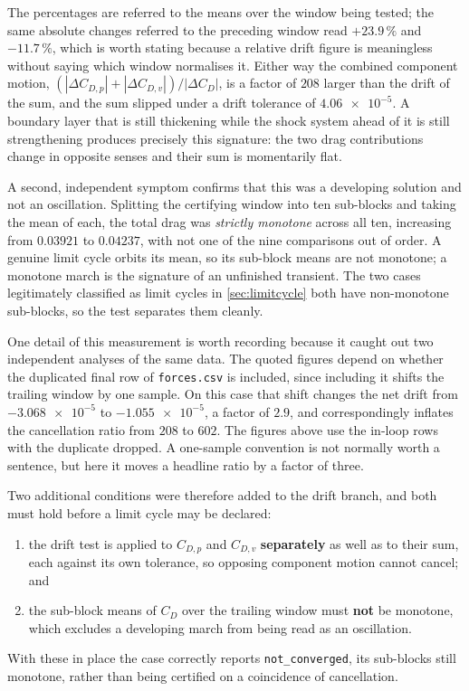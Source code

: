 \noindent The percentages are referred to the means over the window being tested; the
same absolute changes referred to the preceding window read $+23.9\,\%$ and
$-11.7\,\%$, which is worth stating because a relative drift figure is meaningless
without saying which window normalises it. Either way the combined component motion,
$(|\Delta C_{D,p}|+|\Delta C_{D,v}|)/|\Delta C_D|$, is a factor of $208$ larger than the
drift of the sum, and the sum slipped under a drift tolerance of $\num{4.06e-5}$. A
boundary layer that is still thickening while the shock system ahead of it is still
strengthening produces precisely this signature: the two drag contributions change in
opposite senses and their sum is momentarily flat.

A second, independent symptom confirms that this was a developing solution and not
an oscillation. Splitting the certifying window into ten sub-blocks and taking the
mean of each, the total drag was \emph{strictly monotone} across all ten,
increasing from $\num{0.03921}$ to $\num{0.04237}$, with not one of the nine
comparisons out of order. A genuine limit cycle orbits its
mean, so its sub-block means are not monotone; a monotone march is the signature of
an unfinished transient. The two cases legitimately classified as limit cycles in
\cref{sec:limitcycle} both have non-monotone sub-blocks, so the test separates them
cleanly.

One detail of this measurement is worth recording because it caught out two independent
analyses of the same data. The quoted figures depend on whether the duplicated final row
of \texttt{forces.csv} is included, since including it shifts the trailing window by one
sample. On this case that shift changes the net drift from $\num{-3.068e-5}$ to
$\num{-1.055e-5}$, a factor of $2.9$, and correspondingly inflates the cancellation ratio
from $208$ to $602$. The figures above use the in-loop rows with the duplicate dropped.
A one-sample convention is not normally worth a sentence, but here it moves a headline
ratio by a factor of three.

Two additional conditions were therefore added to the drift branch, and both must
hold before a limit cycle may be declared:
\begin{enumerate}
  \item the drift test is applied to $C_{D,p}$ and $C_{D,v}$ \textbf{separately} as
  well as to their sum, each against its own tolerance, so opposing component
  motion cannot cancel; and
  \item the sub-block means of $C_D$ over the trailing window must \textbf{not} be
  monotone, which excludes a developing march from being read as an oscillation.
\end{enumerate}
With these in place the case correctly reports \texttt{not\_converged}, its
sub-blocks still monotone, rather than being certified on a coincidence of
cancellation.

